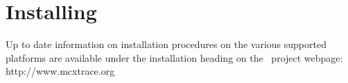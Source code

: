 \chapter{Installing \MCX}
\label{c:install}
Up to date information on installation procedures on the various supported
platforms are available under the installation heading on the \MCX\ project
webpage: http://www.mcxtrace.org

